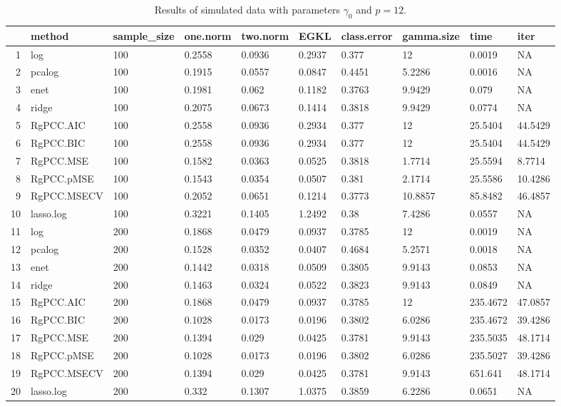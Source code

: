 \begin{table}[ht]
\centering
\begin{tabular}{rlllllllll}
  \hline
 & method & sample\_size & one.norm & two.norm & EGKL & class.error & gamma.size & time & iter \\ 
  \hline
1 & log & 100 & 0.2558 & 0.0936 & 0.2937 & 0.377 & 12 & 0.0019 & NA \\ 
  2 & pcalog & 100 & 0.1915 & 0.0557 & 0.0847 & 0.4451 & 5.2286 & 0.0016 & NA \\ 
  3 & enet & 100 & 0.1981 & 0.062 & 0.1182 & 0.3763 & 9.9429 & 0.079 & NA \\ 
  4 & ridge & 100 & 0.2075 & 0.0673 & 0.1414 & 0.3818 & 9.9429 & 0.0774 & NA \\ 
  5 & RgPCC.AIC & 100 & 0.2558 & 0.0936 & 0.2934 & 0.377 & 12 & 25.5404 & 44.5429 \\ 
  6 & RgPCC.BIC & 100 & 0.2558 & 0.0936 & 0.2934 & 0.377 & 12 & 25.5404 & 44.5429 \\ 
  7 & RgPCC.MSE & 100 & 0.1582 & 0.0363 & 0.0525 & 0.3818 & 1.7714 & 25.5594 & 8.7714 \\ 
  8 & RgPCC.pMSE & 100 & 0.1543 & 0.0354 & 0.0507 & 0.381 & 2.1714 & 25.5586 & 10.4286 \\ 
  9 & RgPCC.MSECV & 100 & 0.2052 & 0.0651 & 0.1214 & 0.3773 & 10.8857 & 85.8482 & 46.4857 \\ 
  10 & lasso.log & 100 & 0.3221 & 0.1405 & 1.2492 & 0.38 & 7.4286 & 0.0557 & NA \\ 
  11 & log & 200 & 0.1868 & 0.0479 & 0.0937 & 0.3785 & 12 & 0.0019 & NA \\ 
  12 & pcalog & 200 & 0.1528 & 0.0352 & 0.0407 & 0.4684 & 5.2571 & 0.0018 & NA \\ 
  13 & enet & 200 & 0.1442 & 0.0318 & 0.0509 & 0.3805 & 9.9143 & 0.0853 & NA \\ 
  14 & ridge & 200 & 0.1463 & 0.0324 & 0.0522 & 0.3823 & 9.9143 & 0.0849 & NA \\ 
  15 & RgPCC.AIC & 200 & 0.1868 & 0.0479 & 0.0937 & 0.3785 & 12 & 235.4672 & 47.0857 \\ 
  16 & RgPCC.BIC & 200 & 0.1028 & 0.0173 & 0.0196 & 0.3802 & 6.0286 & 235.4672 & 39.4286 \\ 
  17 & RgPCC.MSE & 200 & 0.1394 & 0.029 & 0.0425 & 0.3781 & 9.9143 & 235.5035 & 48.1714 \\ 
  18 & RgPCC.pMSE & 200 & 0.1028 & 0.0173 & 0.0196 & 0.3802 & 6.0286 & 235.5027 & 39.4286 \\ 
  19 & RgPCC.MSECV & 200 & 0.1394 & 0.029 & 0.0425 & 0.3781 & 9.9143 & 651.641 & 48.1714 \\ 
  20 & lasso.log & 200 & 0.332 & 0.1307 & 1.0375 & 0.3859 & 6.2286 & 0.0651 & NA \\ 
   \hline
\end{tabular}
\caption{Results of simulated data with parameters $\gamma_0$ and $p =12$. } 
\label{fig-0-script-5-12-metrics-p}
\end{table}
